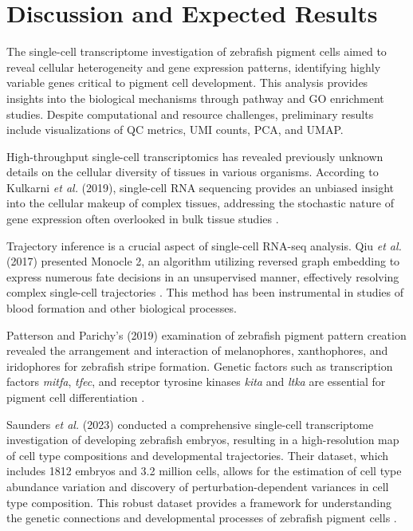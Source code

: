 \documentclass[runningheads]{llncs}
\begin{document}
\section{Discussion and Expected Results}

The single-cell transcriptome investigation of zebrafish pigment cells aimed to reveal cellular heterogeneity and gene expression patterns, identifying highly variable genes critical to pigment cell development. This analysis provides insights into the biological mechanisms through pathway and GO enrichment studies. Despite computational and resource challenges, preliminary results include visualizations of QC metrics, UMI counts, PCA, and UMAP.

High-throughput single-cell transcriptomics has revealed previously unknown details on the cellular diversity of tissues in various organisms. According to Kulkarni \textit{et al.} (2019), single-cell RNA sequencing provides an unbiased insight into the cellular makeup of complex tissues, addressing the stochastic nature of gene expression often overlooked in bulk tissue studies \cite{kulkarni2019beyond}.

Trajectory inference is a crucial aspect of single-cell RNA-seq analysis. Qiu \textit{et al.} (2017) presented Monocle 2, an algorithm utilizing reversed graph embedding to express numerous fate decisions in an unsupervised manner, effectively resolving complex single-cell trajectories \cite{qiu2017reversed}. This method has been instrumental in studies of blood formation and other biological processes.

Patterson and Parichy's (2019) examination of zebrafish pigment pattern creation revealed the arrangement and interaction of melanophores, xanthophores, and iridophores for zebrafish stripe formation. 
Genetic factors such as transcription factors \textit{mitfa}, \textit{tfec}, and receptor tyrosine kinases \textit{kita} and \textit{ltka} are essential for pigment cell differentiation \cite{patterson2019zebrafish}.

Saunders \textit{et al.} (2023) conducted a comprehensive single-cell transcriptome investigation of developing zebrafish embryos, resulting in a high-resolution map of cell type compositions and developmental trajectories. Their dataset, which includes 1812 embryos and 3.2 million cells, allows for the estimation of cell type abundance variation and discovery of perturbation-dependent variances in cell type composition. This robust dataset provides a framework for understanding the genetic connections and developmental processes of zebrafish pigment cells \cite{saunders2023embryo}.
\end{document}
